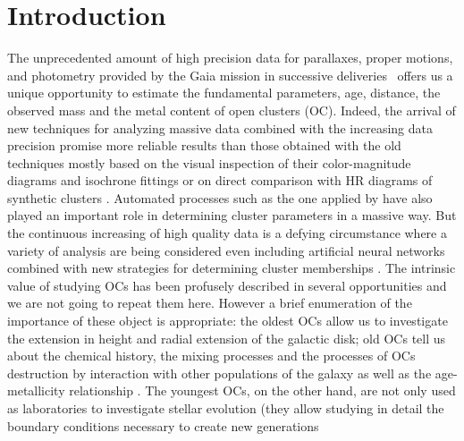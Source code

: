 \documentclass{aa}
\begin{document}

\maketitle


\section{Introduction}

 The unprecedented amount of high precision data for parallaxes, proper motions,
 and photometry provided by the Gaia mission in successive
 deliveries~\citep[DR2 and EDR3,][]{Gaia_2016,Gaia_EDR3} offers us a unique
 opportunity to estimate the fundamental parameters, age, distance, the observed
 mass and the metal content of open clusters (OC).
 Indeed, the arrival of new techniques for
 analyzing massive data combined with the increasing data precision promise
 more reliable results than those obtained with the old techniques mostly
 based on the visual inspection of their color-magnitude diagrams and
 isochrone fittings \citep{Phelps1994} or on direct comparison with HR diagrams
 of synthetic clusters \citep{Siess1997}. Automated processes such as the one
 applied by \cite{Kharchenko_2012} have also played an important role in
 determining cluster parameters in a massive way. But the continuous increasing
 of high quality data is a defying circumstance where a variety of analysis are
 being considered even including artificial neural networks
 \citep{Cantat_2020} combined with new strategies for determining cluster
 memberships \citep{Krone2014,Cantat2018}.
 The intrinsic value of studying OCs has been profusely described in several
 opportunities and we are not going to repeat them here. However a brief
 enumeration of the importance of these object is appropriate: the oldest OCs
 allow us to investigate the extension in height and radial extension of the
 galactic disk; old OCs tell us about the chemical history, the mixing processes
 and the processes of OCs destruction by interaction with other populations of
 the galaxy as well as the age-metallicity relationship 
 \citep{Friel1995,Tosi2004,Hayes2015}. The youngest OCs, on the other hand, are
 not only used as laboratories to investigate stellar evolution (they allow
 studying in detail the boundary conditions necessary to create new generations
\end{document}
